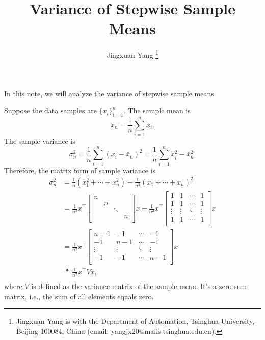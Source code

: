 \documentclass{article}
\title{Variance of Stepwise Sample Means}
\author{Jingxuan Yang%
\thanks{Jingxuan Yang is with the Department of Automation, Tsinghua University, Beijing 100084, China (email: yangjx20@mails.tsinghua.edu.cn).}
}
\begin{document}
\maketitle

In this note, we will analyze the variance of stepwise sample means.

Suppose the data samples are $\{x_i\}_{i=1}^n$. The sample mean is
\begin{equation}
  \bar{x}_n=\frac{1}{n}\sum_{i=1}^nx_i.
\end{equation}
The sample variance is
\begin{equation}
  \label{eq:var_def}
  \sigma_n^2
  =\frac{1}{n}\sum_{i=1}^n(x_i-\bar{x}_n)^2
  =\frac{1}{n}\sum_{i=1}^nx_i^2-\bar{x}_n^2.
\end{equation}
Therefore, the matrix form of sample variance is
\begin{equation}
  \begin{aligned}
    \sigma_n^2
    &=\frac{1}{n}(x_1^2+\cdots+x_n^2)-\frac{1}{n^2}(x_1+\cdots+x_n)^2\\
    &=\frac{1}{n^2}x^\top\begin{bmatrix}
      n & & & \\
      & n & & \\
      & & \ddots & \\
      & & & n \\
    \end{bmatrix}x
    -\frac{1}{n^2}x^\top\begin{bmatrix}
      1 & 1 & \cdots & 1 \\
      1 & 1 & \cdots & 1 \\
      \vdots & \vdots & \ddots & \vdots \\
      1 & 1 & \cdots & 1 \\
    \end{bmatrix}x \\
    &=\frac{1}{n^2}x^\top\begin{bmatrix}
      n-1 & -1 & \cdots & -1 \\
      -1 & n-1 & \cdots & -1 \\
      \vdots & \vdots & \ddots & \vdots \\
      -1 & -1 & \cdots & n-1 \\
    \end{bmatrix}x\\
    &\triangleq\frac{1}{n^2}x^\top Vx,\\
  \end{aligned}
\end{equation}
where $V$ is defined as the variance matrix of the sample mean. It's a zero-sum matrix, i.e., the sum of all elements equals zero.
\end{document}
